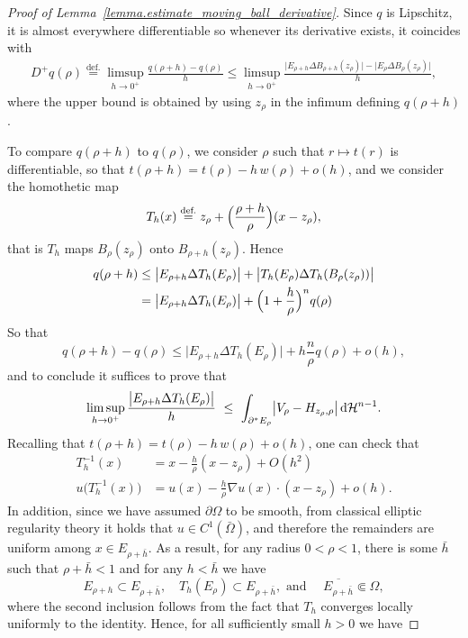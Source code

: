 \documentclass[11pt]{amsart}
\theoremstyle{plain}
\theoremstyle{definition}
\newcommand{\dHn}{\,\dd\mathcal{H}^{n-1}}
\newcommand{\eqdef}{\overset{\text{def.}}{=}}
\def\dd{{\rm d}}
\begin{document}
\begin{proof}[Proof of Lemma~\ref{lemma.estimate_moving_ball_derivative}]
Since $q$ is Lipschitz, it is almost everywhere differentiable so whenever its derivative exists, it coincides with
\begin{align*}
  D^+q(\rho)\eqdef \limsup_{h\to0^+}\frac{q(\rho+h)-q(\rho)}{h}
  \le\limsup_{h\to0^+}
  \frac{\bigl|E_{\rho+h}\Delta B_{\rho+h}(z_\rho)\bigr|-\bigl|E_\rho\Delta B_\rho(z_\rho)\bigr|}{h},
\end{align*}
where the upper bound is obtained by using $z_\rho$ in the infimum defining $q(\rho + h)$. 

To compare $q(\rho+h)$ to $q(\rho)$, we consider $\rho$ such that $r\mapsto t(r)$ is differentiable, so that $t(\rho+h)=t(\rho)-h\,w(\rho)+o(h)$, and we consider the homothetic map
\[
  T_h(x)\eqdef z_\rho+\Bigl(\frac{\rho+h}{\rho}\Bigr)(x-z_\rho),
\]
that is $T_h$ maps $B_\rho(z_\rho)$ onto $B_{\rho+h}(z_\rho)$. Hence
\begin{align*}
  q(\rho+h)
  &\le\bigl|E_{\rho+h}\Delta T_h(E_\rho)\bigr|
   +\bigl|T_h(E_\rho)\Delta T_h(B_\rho(z_\rho))\bigr|\\
  &=\bigl|E_{\rho+h}\Delta T_h(E_\rho)\bigr|
   +\Bigl(1+\frac{h}{\rho}\Bigr)^{n}q(\rho)
\end{align*}
So that 
\[
  q(\rho+h) - q(\rho) \le \bigl|E_{\rho+h}\Delta T_h(E_\rho)\bigr|
   +h\frac{n}{\rho}q(\rho) + o(h), 
\]
and to conclude it suffices to prove that
\[
  \limsup_{h\to0^+}\frac{\bigl|E_{\rho+h} \Delta T_h(E_\rho)\bigr|}{h}
  \ \le\ \int_{\partial^*E_\rho}\bigl|V_\rho-H_{z_\rho,\rho}\bigr|\dHn .
\]
Recalling that $t(\rho+h)=t(\rho)-h\,w(\rho)+o(h)$, one can check that
\begin{align*}
  T_h^{-1}(x)
  &=
  x-\frac{h}{\rho}(x-z_\rho)+O(h^2)\\  
  u\bigl(T_h^{-1}(x)\bigr)
  &=
  u(x)-\frac{h}{\rho}\nabla u(x)\cdot(x-z_\rho)+o(h). 
\end{align*}
In addition, since we have assumed $\partial \Omega$ to be smooth, from classical elliptic regularity theory it holds that $u \in C^1(\bar \Omega)$, and therefore the remainders are uniform among $x \in E_{\rho + \bar h}$. As a result, for any radius $0 < \rho < 1$, there is some $\bar h$ such that $\rho + \bar h < 1$ and for any $h < \bar h$ we have 
\[
  E_{\rho + h} \subset E_{\rho + \bar h}, \quad 
  T_h(E_\rho) \subset E_{\rho + \bar h}, 
  \text{ and }
  \quad 
  \overline{E_{\rho + \bar h}} \Subset \Omega,
\]
where the second inclusion follows from the fact that $T_h$ converges locally uniformly to the identity. Hence, for all sufficiently small $h>0$ we have

\end{proof}
\end{document}
